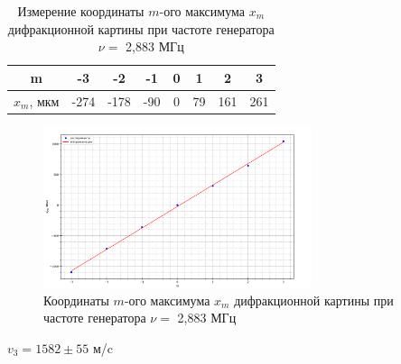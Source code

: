 \documentclass[a4paper,12pt]{article}
\begin{document}
\begin{table}[!h]
\begin{center}
\begin{tabular}{|c|c|c|c|c|c|c|c|}
\hline
     m & -3 & -2& -1 & 0 & 1 & 2 & 3 \\ \hline
     $x_m$, мкм & -274 & -178 & -90 & 0 & 79 & 161 & 261  \\ \hline
\end{tabular}
\end{center}
\caption{Измерение координаты $ m $-ого максимума $ x_m $ дифракционной картины при частоте генератора $ \nu = $ 2,883 МГц}
\end{table}
\begin{figure}[!h]
		\centering	
		\includegraphics[width=0.7\textwidth]{graph3.png}
		\caption{Координаты $ m $-ого максимума $ x_m $ дифракционной картины при частоте генератора $ \nu = $ 2,883 МГц}
		\label{diff}
	\end{figure}
\begin{center}
    $v_3= 1582\pm 55$ м/c
\end{center}
\end{document}
